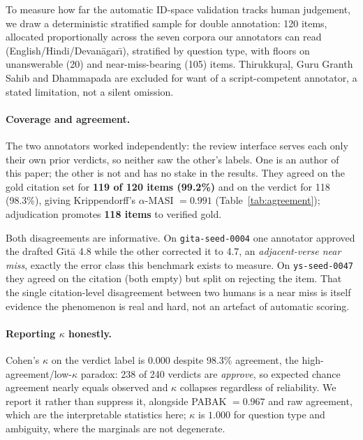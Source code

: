 \documentclass[11pt]{article}
\begin{document}
To measure how far the automatic ID-space validation tracks human judgement, we
draw a deterministic stratified sample for double annotation: 120 items,
allocated proportionally across the seven corpora our annotators can read
(English/Hindi/Devan\={a}gar\={\i}), stratified by question type, with floors on
unanswerable (20) and near-miss-bearing (105) items. Thirukku\d{r}a\d{l}, Guru
Granth Sahib and Dhammapada are excluded for want of a script-competent
annotator, a stated limitation, not a silent omission.

\paragraph{Coverage and agreement.} The two annotators worked independently: the
review interface serves each only their own prior verdicts, so neither saw the
other's labels. One is an author of this paper; the other is not and has no
stake in the results. They agreed on the gold citation set for \textbf{119 of
120 items (99.2\%)} and on the verdict for 118 (98.3\%), giving Krippendorff's
$\alpha$-MASI $=\mathbf{0.991}$ \cite{krippendorff2011,passonneau2006masi}
(Table~\ref{tab:agreement}); adjudication promotes \textbf{118 items} to
verified gold.

Both disagreements are informative. On \texttt{gita-seed-0004} one annotator
approved the drafted G\={\i}t\={a} 4.8 while the other corrected it to 4.7, an
\emph{adjacent-verse near miss}, exactly the error class this benchmark exists to
measure. On \texttt{ys-seed-0047} they agreed on the citation (both empty) but
split on rejecting the item. That the single citation-level disagreement between
two humans is a near miss is itself evidence the phenomenon is real and hard,
not an artefact of automatic scoring.

\paragraph{Reporting $\kappa$ honestly.} Cohen's $\kappa$ on the verdict label is
$0.000$ despite 98.3\% agreement, the high-agreement/low-$\kappa$ paradox: 238
of 240 verdicts are \emph{approve}, so expected chance agreement nearly equals
observed and $\kappa$ collapses regardless of reliability. We report it rather
than suppress it, alongside PABAK $=0.967$ and raw agreement, which are the
interpretable statistics here; $\kappa$ is $1.000$ for question type and
ambiguity, where the marginals are not degenerate.
\end{document}
